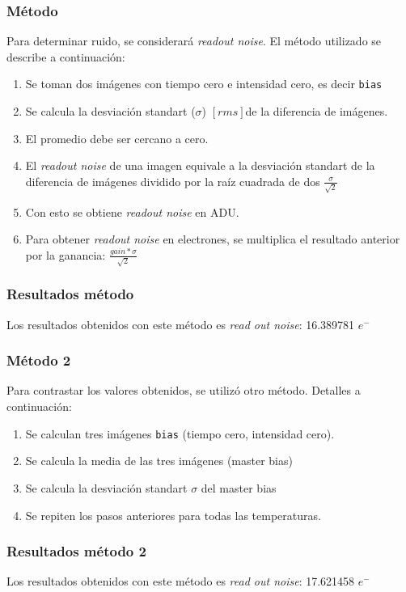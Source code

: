 \documentclass[a4paper,10pt]{article}
\begin{document}
\subsubsection{Método}
Para determinar ruido, se considerará \textit{readout noise}. El método utilizado se describe a continuación:
\begin{enumerate}
\item Se toman dos imágenes con tiempo cero e intensidad cero, es decir {\tt bias}
\item Se calcula la desviación standart ($\sigma$) $[rms]$de la diferencia de imágenes.
\item El promedio debe ser cercano a cero.
\item El \textit{readout noise} de una imagen equivale a la desviación standart de la diferencia de imágenes dividido por la raíz cuadrada de dos $\frac{\sigma}{\sqrt{2}}$
\item Con esto se obtiene \textit{readout noise} en ADU.
\item Para obtener \textit{readout noise} en electrones, se multiplica el resultado anterior por la ganancia: $\frac{gain*\sigma}{\sqrt{2}}$
\end{enumerate}
\subsubsection{Resultados método}
Los resultados obtenidos con este método es \textit{read out noise}: 16.389781 $e^-$
\subsubsection{Método 2}
Para contrastar los valores obtenidos, se utilizó otro método. Detalles a continuación:
\begin{enumerate}
\item Se calculan tres imágenes {\tt bias} (tiempo cero, intensidad cero).
\item Se calcula la media de las tres imágenes (master bias)
\item Se calcula la desviación standart $\sigma$ del master bias
\item Se repiten los pasos anteriores para todas las temperaturas.
\end{enumerate}
\subsubsection{Resultados método 2}
Los resultados obtenidos con este método es \textit{read out noise}: 17.621458  $e^-$
\end{document}
